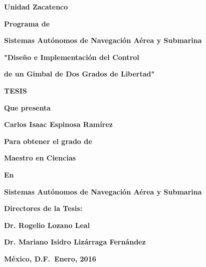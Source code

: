 \begin{minipage}{1\textwidth}
\vspace{0.2cm}
\centerline{\Large \bf Unidad Zacatenco}
\vspace{0.25cm}
\centerline{\bf Programa de}
\vspace{0.20cm}
\centerline{\large \bf Sistemas Aut\'onomos de Navegaci\'on A\'erea y Submarina}
\vspace{0.8cm}
\centerline{\Large \bf "Dise\~no e Implementaci\'on del Control }
\vspace{0.4cm}
\centerline{\Large \bf de un Gimbal de Dos Grados de Libertad"}
\vspace{0.8cm}
\centerline{\Large \bf TESIS}
\vspace{0.4cm}
\centerline{\bf Que presenta}
\vspace{0.3cm}
\centerline{\Large \bf Carlos Isaac Espinosa Ram\'irez}
\vspace{0.3cm}
\centerline{\bf Para obtener el grado de }
\vspace{0.3cm}
\centerline{\Large \bf Maestro en Ciencias}
\vspace{0.3cm}
\centerline{\bf En}
\vspace{0.3cm}
\centerline{\Large \bf Sistemas Aut\'onomos de Navegaci\'on A\'erea y Submarina}
\vspace{0.6cm}
\centerline{\bf Directores de la Tesis:}
\vspace{0.20cm}
\centerline{\Large \bf Dr. Rogelio Lozano Leal}
\vspace{0.20cm}
\centerline{\Large \bf Dr. Mariano Isidro Liz\'arraga Fern\'andez}
\vspace{0.6cm}
{\large \bf M\'{e}xico, D.F.\ \hfill Enero, 2016}
\end{minipage}%

